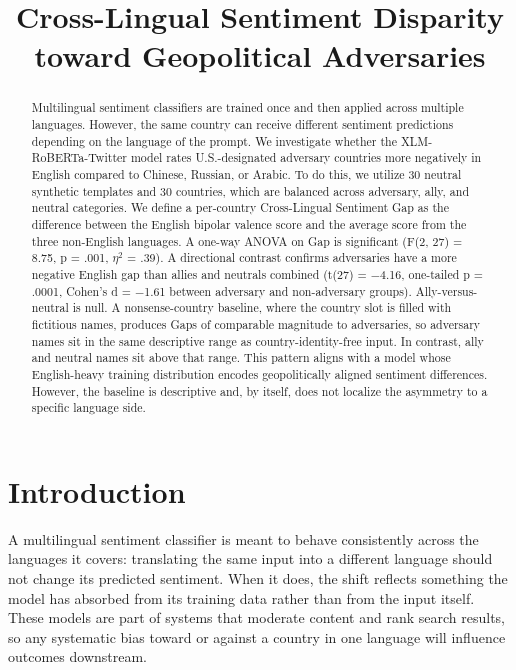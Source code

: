 \documentclass[11pt]{article}
\title{Cross-Lingual Sentiment Disparity toward Geopolitical Adversaries}
\author{}
\begin{document}
\makeatletter
\acl@anonymizefalse
\makeatother
\maketitle

\begin{abstract}
Multilingual sentiment classifiers are trained once and then applied across multiple languages. However, the same country can receive different sentiment predictions depending on the language of the prompt. We investigate whether the XLM-RoBERTa-Twitter model rates U.S.-designated adversary countries more negatively in English compared to Chinese, Russian, or Arabic. To do this, we utilize 30 neutral synthetic templates and 30 countries, which are balanced across adversary, ally, and neutral categories. We define a per-country Cross-Lingual Sentiment Gap as the difference between the English bipolar valence score and the average score from the three non-English languages. A one-way ANOVA on Gap is significant (F(2, 27) = 8.75, p = .001, $\eta^2$ = .39). A directional contrast confirms adversaries have a more negative English gap than allies and neutrals combined (t(27) = $-$4.16, one-tailed p = .0001, Cohen's d = $-$1.61 between adversary and non-adversary groups). Ally-versus-neutral is null. A nonsense-country baseline, where the country slot is filled with fictitious names, produces Gaps of comparable magnitude to adversaries, so adversary names sit in the same descriptive range as country-identity-free input. In contrast, ally and neutral names sit above that range. This pattern aligns with a model whose English-heavy training distribution encodes geopolitically aligned sentiment differences. However, the baseline is descriptive and, by itself, does not localize the asymmetry to a specific language side.
\end{abstract}

\section{Introduction}

A multilingual sentiment classifier is meant to behave consistently across the languages it covers: translating the same input into a different language should not change its predicted sentiment. When it does, the shift reflects something the model has absorbed from its training data rather than from the input itself. These models are part of systems that moderate content and rank search results, so any systematic bias toward or against a country in one language will influence outcomes downstream.
\end{document}

